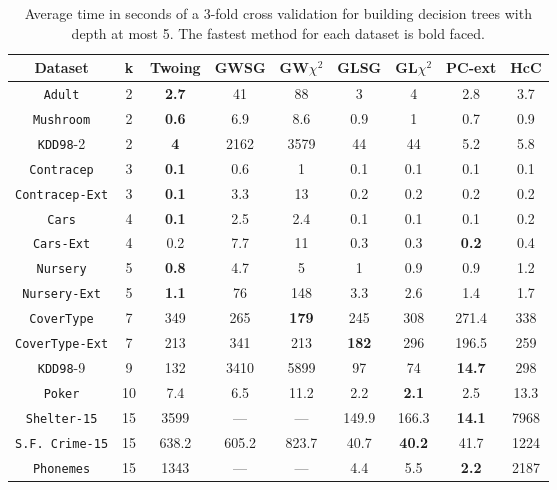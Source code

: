 \begin{table*}[]
\small
\centering
\begin{tabular}{c|c|c|c|c|c|c|c|c}
Dataset             & k  & Twoing     & GWSG  & GW$\chi^2$  & GLSG      & GL$\chi^2$ & PC-ext     & HcC        \\ \hline
{\tt Adult}         & 2  & {\bf  2.7} & 41    & 88          & 3         & 4          & 2.8        & 3.7        \\
{\tt Mushroom}      & 2  & {\bf 0.6}  & 6.9   & 8.6         & 0.9       & 1          & 0.7        & 0.9        \\
{\tt KDD98}-2       & 2  & {\bf 4}    & 2162  & 3579        & 44        & 44         & 5.2        & 5.8        \\
{\tt Contracep}     & 3  & {\bf 0.1}  & 0.6   & 1           & 0.1       & 0.1        & 0.1        & 0.1        \\
{\tt Contracep-Ext} & 3  & {\bf 0.1}  & 3.3   & 13          & 0.2       & 0.2        & 0.2        & 0.2        \\
{\tt Cars}          & 4  & {\bf 0.1}  & 2.5   & 2.4         & 0.1       & 0.1        & 0.1        & 0.2        \\
{\tt Cars-Ext}      & 4  & 0.2        & 7.7   & 11          & 0.3       & 0.3        & {\bf 0.2}  & 0.4        \\
{\tt Nursery}       & 5  & {\bf 0.8}  & 4.7   & 5           & 1         & 0.9        & 0.9        & 1.2        \\
{\tt Nursery-Ext}   & 5  & {\bf 1.1}  & 76    & 148         & 3.3       & 2.6        & 1.4        & 1.7        \\
{\tt CoverType}     & 7  & 349        & 265   & {\bf 179}   & 245       & 308        & 271.4      & 338        \\
{\tt CoverType-Ext} & 7  & 213        & 341   & 213         & {\bf 182} & 296        & 196.5      & 259        \\
{\tt KDD98}-9       & 9  & 132        & 3410  & 5899        & 97        & 74         & {\bf 14.7 }& 298        \\ 
{\tt Poker}         & 10 & 7.4        & 6.5   & 11.2        & 2.2       & {\bf 2.1}  & 2.5        & 13.3       \\
{\tt Shelter-15}    & 15 & 3599       & ---   & ---         & 149.9     & 166.3      & {\bf 14.1 }& 7968       \\   
{\tt S.F. Crime-15} & 15 & 638.2      & 605.2 & 823.7       & 40.7      & {\bf 40.2} & 41.7       & 1224       \\ 
{\tt Phonemes}      & 15 & 1343       & ---   & ---         & 4.4       & 5.5        & {\bf 2.2 } & 2187
\end{tabular}
\caption{Average time in seconds of a 3-fold cross validation for building decision trees with depth at most 5. The fastest method for each dataset is bold faced.}
\label{tab:time-5}
\end{table*}
